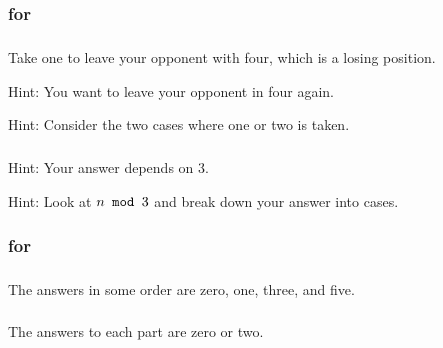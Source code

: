 \subsection{\answers}

\subsubsection{\answers for  \subnotlast}

\subsubsection*{ \answers}
\begin{apart}
    \item Take one to leave your opponent with four, which is a losing position.
    \item Hint: You want to leave your opponent in four again.
    \item Hint: Consider the two cases where one or two is taken.
\end{apart}

\subsubsection*{ \answers}
\begin{apart}
    \item Hint: Your answer depends on  3.
    \item Hint: Look at $n \texttt{ mod } 3$ and break down your answer into cases.
\end{apart}

\subsubsection{\answers for 
\submod}

\subsubsection*{ \answers}
  The answers in some order are zero, one, three, and five.

\subsubsection*{ \answers}
    The answers to each part are zero or two.
    
